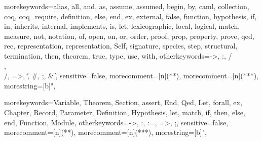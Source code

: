 \newcommand{\ocaml}{{\sf OCaml}}
\newcommand{\moca}{{\sf Moca}}
\newcommand{\focal}{{\sf FoCaL}}
\newcommand{\coq}{{\sf Coq}}
\newcommand{\cime}{{\sf CiME}}
\newcommand{\latex}{{\sf LaTeX}}
\newcommand{\zenon}{{\sf Zenon}}
\newcommand{\ocamldoc}{{\sf ocamldoc}}
\newcommand{\ocamlyacc}{{\sf ocamlyacc}}
\newcommand{\ocamllex}{{\sf ocamllex}}
\newcommand{\gcc}{{\sf gcc}}
\newcommand{\focdoc}{\textsc{focdoc}}
\newcommand{\focalize}{{\sf FoCaLize}}
\newcommand{\focalizedoc}{{\sf FoCaLizeDoc}}
\newcommand{\focalizec}{{\sf focalizec}}
\newcommand{\focalizedep}{{\sf focalizedep}}
\newcommand{\decldeps}[1] {\lbag\ #1\rbag}
\newcommand{\defdeps}[1]
  {\lbag\hspace{-0.2cm}\lbag\ #1\rbag\hspace{-0.2cm}\rbag}

  {morekeywords={alias, all, and, as, assume, assumed, begin, by, caml,
      collection, coq, coq_require, definition, else, end,
      ex, external, false, function, hypothesis, if, in,
      inherits, internal, implements, is, let, lexicographic,
      local, logical, match, measure, not, notation, of, open,
      on, or, order, proof, prop, property, prove, qed, rec,
      representation, representation, Self, signature, species, step,
      structural, termination, then, theorem, true, type, use,
      with},
    otherkeywords={->, :, /\\, \\/, =>, \~, \#, ;, \& \|},
    sensitive=false,
    morecomment=[n]{(*}{*)},  %
    morecomment=[n]{(**}{*)},  %
    morestring=[b]",
  }

\newcommand{\setlangfocalize}{
\lstset{
  language=Focal, tabsize=2, frame=single, breaklines=true,
  basicstyle=\ttfamily, framexleftmargin=1mm, xleftmargin=1mm
}
}
\setlangfocalize


  {morekeywords={Variable, Theorem, Section, assert, End, Qed, Let,
      forall, ex, Chapter, Record, Parameter, Definition, Hypothesis,
      let, match, if, then, else, end, Function, Module},
    otherkeywords={->, :, :=, =>, ;},
    sensitive=false,
    morecomment=[n]{(*}{*)},   %
    morecomment=[n]{(**}{*)},  %
    morestring=[b]",
  }

\newcommand{\setlangcoq}{
\lstset{
  language=MyCoq, tabsize=2, frame=single, breaklines=true,
  basicstyle=\ttfamily, framexleftmargin=1mm, xleftmargin=1mm
}
}



